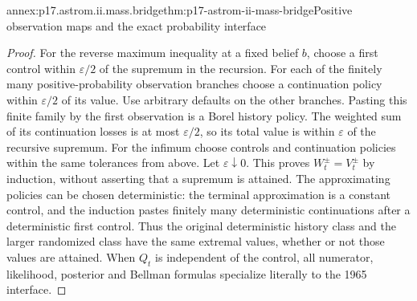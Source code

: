 \begin{annexitem}{annex:p17.astrom.ii.mass.bridge}{thm:p17-astrom-ii-mass-bridge}{Positive observation maps and the exact probability interface}
\begin{proof}
For the reverse maximum inequality at a fixed
belief \(b\), choose a first control within
\(\varepsilon/2\) of the supremum in the recursion.
For each of the finitely many positive-probability
observation branches choose a continuation policy
within \(\varepsilon/2\) of its value.
Use arbitrary defaults on the other branches.
Pasting this finite family by the first observation
is a Borel history policy. The weighted sum of its
continuation losses is at most \(\varepsilon/2\),
so its total value is within \(\varepsilon\)
of the recursive supremum.
For the infimum choose controls and continuation
policies within the same tolerances from above.
Let \(\varepsilon\downarrow0\).
This proves \(W_t^\pm=V_t^\pm\) by induction,
without asserting that a supremum is attained.
The approximating policies can be chosen deterministic:
the terminal approximation is a constant control, and
the induction pastes finitely many deterministic
continuations after a deterministic first control.
Thus the original deterministic history class and
the larger randomized class have the same extremal
values, whether or not those values are attained.
When \(Q_t\) is independent of the control,
all numerator, likelihood, posterior and
Bellman formulas specialize literally to the
1965 interface.
\end{proof}
\end{annexitem}


